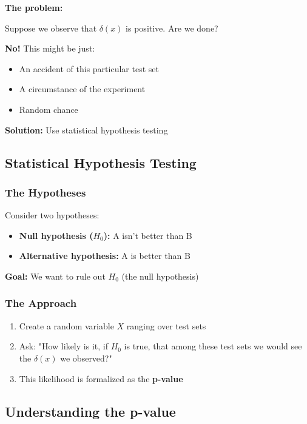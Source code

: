 \documentclass[11pt,a4paper]{article}
\theoremstyle{definition}
\theoremstyle{plain}
\theoremstyle{remark}
\begin{document}
\textbf{The problem:}

Suppose we observe that $\delta(x)$ is positive. Are we done?

\textbf{No!} This might be just:
\begin{itemize}
    \item An accident of this particular test set
    \item A circumstance of the experiment
    \item Random chance
\end{itemize}

\textbf{Solution:} Use statistical hypothesis testing

\subsection{Statistical Hypothesis Testing}

\subsubsection{The Hypotheses}

Consider two hypotheses:

\begin{itemize}
    \item \textbf{Null hypothesis ($H_0$):} A isn't better than B
    \item \textbf{Alternative hypothesis:} A is better than B
\end{itemize}

\textbf{Goal:} We want to rule out $H_0$ (the null hypothesis)

\subsubsection{The Approach}

\begin{enumerate}
    \item Create a random variable $X$ ranging over test sets
    \item Ask: "How likely is it, if $H_0$ is true, that among these test sets we would see the $\delta(x)$ we observed?"
    \item This likelihood is formalized as the \textbf{p-value}
\end{enumerate}

\subsection{Understanding the p-value}
\end{document}
